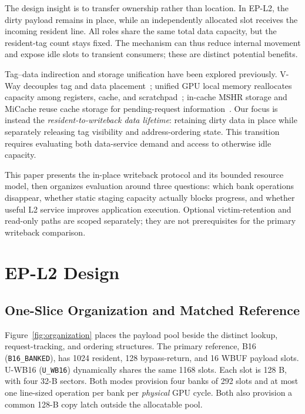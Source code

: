 \documentclass[conference,letterpaper]{IEEEtran}
\newcommand{\epl}{EP-L2}
\newcommand{\base}{B16}
\newcommand{\unif}{U-WB16}
\begin{document}
The design insight is to transfer ownership rather than location. In \epl{}, the dirty payload remains in place, while an independently allocated slot receives the incoming resident line. All roles share the same total data capacity, but the resident-tag count stays fixed. The mechanism can thus reduce internal movement and expose idle slots to transient consumers; these are distinct potential benefits.

Tag--data indirection and storage unification have been explored previously. V-Way decouples tag and data placement~\cite{vway}; unified GPU local memory reallocates capacity among registers, cache, and scratchpad~\cite{unified}; in-cache MSHR storage and MiCache reuse cache storage for pending-request information~\cite{farkas,micache}. Our focus is instead the \emph{resident-to-writeback data lifetime}: retaining dirty data in place while separately releasing tag visibility and address-ordering state. This transition requires evaluating both data-service demand and access to otherwise idle capacity.

This paper presents the in-place writeback protocol and its bounded resource model, then organizes evaluation around three questions: which bank operations disappear, whether static staging capacity actually blocks progress, and whether useful L2 service improves application execution. Optional victim-retention and read-only paths are scoped separately; they are not prerequisites for the primary writeback comparison.

\section{EP-L2 Design}
\subsection{One-Slice Organization and Matched Reference}
Figure~\ref{fig:organization} places the payload pool beside the distinct lookup, request-tracking, and ordering structures. The primary reference, \base{} (\texttt{B16\_BANKED}), has 1024 resident, 128 bypass-return, and 16 WBUF payload slots. \unif{} (\texttt{U\_WB16}) dynamically shares the same 1168 slots. Each slot is 128 B, with four 32-B sectors. Both modes provision four banks of 292 slots and at most one line-sized operation per bank per \emph{physical} GPU cycle. Both also provision a common 128-B copy latch outside the allocatable pool.
\end{document}
